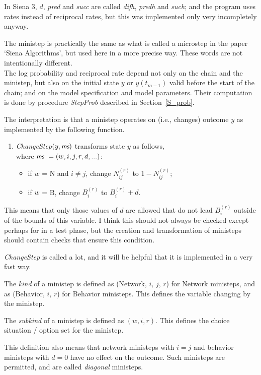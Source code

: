 \documentclass[a4paper,fleqn,12pt]{article}
\newcommand{\ms}{\textsl{\textsf{\small ms}}} %
\begin{document}
In Siena 3, $d$, \textit{pred} and \textit{succ} are called \textit{difh},
\textit{predh} and \textit{such};
and the program uses rates instead of reciprocal rates, but this was
implemented only very incompletely anyway.

The ministep is practically the same as what is called a microstep
in the paper `Siena Algorithms', but used here in a more
precise way. These words are not intentionally different.
\\
The log probability and reciprocal rate depend not only on the
chain and the ministep, but also on the initial state $y$ or $y(t_{m-1})$
valid before the start of the chain; and on the model specification and
model parameters.
Their computation is done by procedure \textit{StepProb} described in
Section~\ref{S_prob}.

The interpretation is that a ministep operates on (i.e., changes)
outcome $y$ as implemented by the following function.
\begin{enumerate}
\item \textit{ChangeStep}$(y, \ms)$ transforms state $y$ as follows,\\
      where $ \ms \ = (w,i,j,r,d, ...)$:
      \begin{itemize}
      \item if $w$ = N and $i \neq j$, change $N^{(r)}_{ij}$ to $1 - N^{(r)}_{ij}$;
      \item if $w$ = B,  change $B^{(r)}_{i}$ to $B^{(r)}_{i} + d$.
      \end{itemize}
\end{enumerate}
This means that only those values of $d$ are allowed that do not lead
$B^{(r)}_{i}$ outside of the bounds of this variable.
I think this should not always be checked except perhaps for in a test phase,
but the creation and transformation of ministeps should contain
checks that ensure this condition.

\textit{ChangeStep} is called a lot, and it will be helpful
that it is implemented in a very fast way.

The \emph{kind} of a ministep is defined as
(Network, $i,\, j,\, r$) for Network ministeps,
and as (Behavior, $i, \, r$) for Behavior ministeps.
This defines the variable changing by the ministep.

The \emph{subkind} of a ministep is defined as
$(w,i,r)$.
This defines the choice situation / option set for the ministep.

This definition also means that network ministeps with $i = j$ and behavior ministeps
with $d = 0$ have no effect on the outcome. Such ministeps are permitted,
and are called \emph{diagonal} ministeps.
\end{document}
